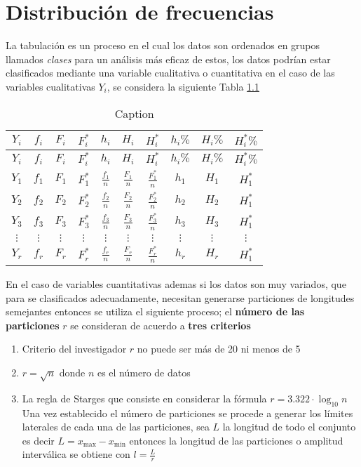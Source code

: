 \documentclass[10pt,]{krantz}
\theoremstyle{definition}
\theoremstyle{definition}
\theoremstyle{definition}
\theoremstyle{remark}
\begin{document}
\hypertarget{distribuciuxf3n-de-frecuencias}{%
\chapter{Distribución de frecuencias}\label{distribuciuxf3n-de-frecuencias}}

La tabulación es un proceso en el cual los datos son ordenados en grupos llamados \emph{clases} para un análisis más eficaz de estos, los datos podrían estar clasificados mediante una variable cualitativa o cuantitativa en el caso de las variables cualitativas \(Y_i\), se considera la siguiente Tabla \ref{tab:ww}

\begin{longtable}[]{@{}cccccccccc@{}}
\caption{\label{tab:ww} Caption}\tabularnewline
\toprule
\(Y_i\) & \(f_i\) & \(F_i\) & \(F_i^*\) & \(h_i\) & \(H_i\) & \(H_i^*\) & \(h_i\%\) & \(H_i\%\) & \(H_i^*\%\)\tabularnewline
\midrule
\endfirsthead
\toprule
\(Y_i\) & \(f_i\) & \(F_i\) & \(F_i^*\) & \(h_i\) & \(H_i\) & \(H_i^*\) & \(h_i\%\) & \(H_i\%\) & \(H_i^*\%\)\tabularnewline
\midrule
\endhead
\(Y_1\) & \(f_1\) & \(F_1\) & \(F_1^*\) & \(\frac{f_1}{n}\) & \(\frac{F_1}{n}\) & \(\frac{F_1^*}{n}\) & \(h_1\) & \(H_1\) & \(H_1^*\)\tabularnewline
\(Y_2\) & \(f_2\) & \(F_2\) & \(F_2^*\) & \(\frac{f_2}{n}\) & \(\frac{F_2}{n}\) & \(\frac{F_2^*}{n}\) & \(h_2\) & \(H_2\) & \(H_1^*\)\tabularnewline
\(Y_3\) & \(f_3\) & \(F_3\) & \(F_3^*\) & \(\frac{f_3}{n}\) & \(\frac{F_3}{n}\) & \(\frac{F_3^*}{n}\) & \(h_3\) & \(H_3\) & \(H_1^*\)\tabularnewline
\(\vdots\) & \(\vdots\) & \(\vdots\) & \(\vdots\) & \(\vdots\) & \(\vdots\) & \(\vdots\) & \(\vdots\) & \(\vdots\) & \(\vdots\)\tabularnewline
\(Y_r\) & \(f_r\) & \(F_r\) & \(F_r^*\) & \(\frac{f_r}{n}\) & \(\frac{F_r}{n}\) & \(\frac{F_r^*}{n}\) & \(h_r\) & \(H_r\) & \(H_1^*\)\tabularnewline
\bottomrule
\end{longtable}

En el caso de variables cuantitativas ademas si los datos son muy variados, que para se clasificados adecuadamente, necesitan generarse particiones de longitudes semejantes entonces se utiliza el siguiente proceso; el \textbf{número de las particiones} \(r\) se consideran de acuerdo a \textbf{tres criterios}

\begin{enumerate}
\def\labelenumi{\arabic{enumi}.}
\item
  Criterio del investigador \(r\) no puede ser más de 20 ni menos de 5
\item
  \(r=\sqrt{n}\) donde \(n\) es el número de datos
\item
  La regla de Starges que consiste en considerar la fórmula \(r=3.322\cdot\log_{10} n\)
  Una vez establecido el número de particiones se procede a generar los límites laterales de cada una de las particiones, sea \(L\) la longitud de todo el conjunto es decir \(L=x_{\text{max}}-x_{\text{min}}\) entonces la longitud de las particiones o amplitud interválica se obtiene con \(l=\frac{L}{r}\)
\end{enumerate}
\end{document}
